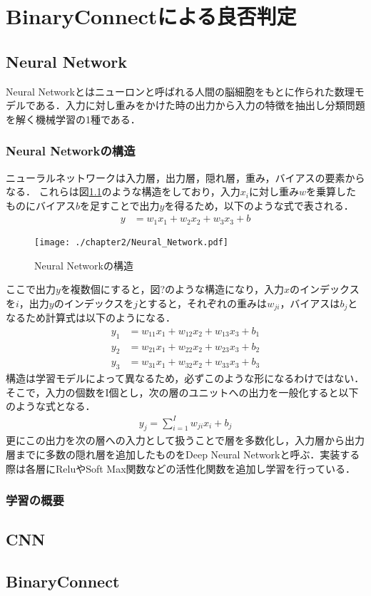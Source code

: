 

\chapter{BinaryConnectによる良否判定}

\section{Neural Network}
Neural Networkとはニューロンと呼ばれる人間の脳細胞をもとに作られた数理モデルである．入力に対し重みをかけた時の出力から入力の特徴を抽出し分類問題を解く機械学習の1種である．

\subsection{Neural Networkの構造}
ニューラルネットワークは入力層，出力層，隠れ層，重み，バイアスの要素からなる．
これらは図\ref{fig_NN}のような構造をしており，入力$x_i$に対し重み$w$を乗算したものにバイアス$b$を足すことで出力$y$を得るため，以下のような式で表される．
\begin{align*}
y &= w_{1}x_{1} + w_{2}x_{2} + w_{3}x_{3} + b
\end{align*}
\begin{figure}[]
  \begin{center}
    \texttt{[image: ./chapter2/Neural\_Network.pdf]}
    \caption{Neural Networkの構造}
    \label{fig_NN}
  \end{center}
\end{figure}
ここで出力$y$を複数個にすると，図?のような構造になり，入力$x$のインデックスを$i$，出力$y$のインデックスを$j$とすると，それぞれの重みは$w_{ji}$，バイアスは$b_j$となるため計算式は以下のようになる．
\begin{align*}
y_{1} &= w_{11}x_{1} + w_{12}x_{2} + w_{13}x_{3} + b_1\\
y_{2} &= w_{21}x_{1} + w_{22}x_{2} + w_{23}x_{3} + b_2\\
y_{3} &= w_{31}x_{1} + w_{32}x_{2} + w_{33}x_{3} + b_3
\end{align*}
構造は学習モデルによって異なるため，必ずこのような形になるわけではない．そこで，入力の個数をI個とし，次の層のユニットへの出力を一般化すると以下のような式となる．
\begin{align*}
y_j = \sum^{I}_{i = 1} w_{ji}x_i + b_j
\end{align*}
更にこの出力を次の層への入力として扱うことで層を多数化し，入力層から出力層までに多数の隠れ層を追加したものをDeep Neural Networkと呼ぶ．実装する際は各層にReluやSoft Max関数などの活性化関数を追加し学習を行っている．

\subsection{学習の概要}

\section{CNN}

\section{BinaryConnect}

